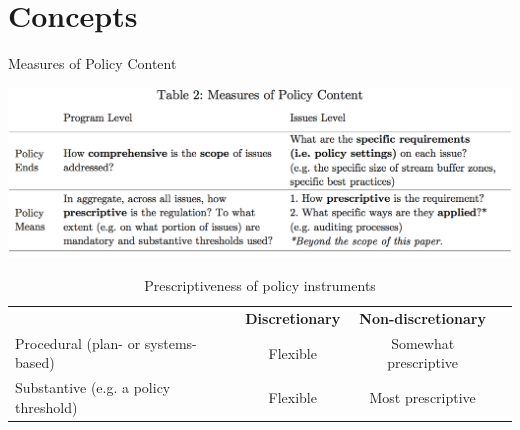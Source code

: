 \documentclass[10pt]{beamer}
\begin{document}
\section{Concepts}

\begin{frame}
\begin{table}[h!]
\renewcommand{\arraystretch}{1.5} 
\centering
\caption{Measures of Policy Content}
\label{questions}
\end{table}
\centering
\includegraphics[trim=0 0 0 2.3cm,clip,width = \textwidth]{table2}
\end{frame}

\begin{frame}
\begin{table}[h!]
\footnotesize
\renewcommand{\arraystretch}{1.5} 
\centering
\caption{Prescriptiveness of policy  instruments}
\label{prescriptiveness}
\begin{tabular}{lccc}
 & \textbf{Discretionary} & \textbf{Non-discretionary} \\
 \cline{2-3} 
Procedural (plan- or systems-based) & Flexible & Somewhat prescriptive \\
 \cline{2-3} 
Substantive (e.g. a policy threshold) & Flexible & Most prescriptive \\
 \cline{2-3} 
\end{tabular}
\end{table}
\end{frame}
\end{document}
